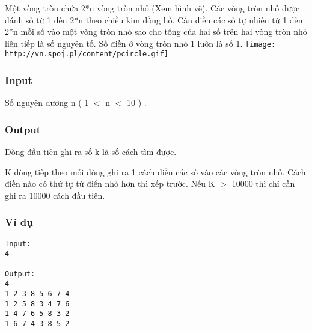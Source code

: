 



   Một vòng tròn chứa 2*n vòng tròn nhỏ (Xem hình vẽ). Các vòng tròn nhỏ được đánh số từ 1 đến 2*n theo chiều kim đồng hồ. Cần điền các số tự nhiên từ 1 đến 2*n mỗi số vào một vòng tròn nhỏ sao cho tổng của hai số trên hai vòng tròn nhỏ liên tiếp là số nguyên tố. Số điền ở vòng tròn nhỏ 1 luôn là số 1.  
\texttt{[image: http://vn.spoj.pl/content/pcircle.gif]}

\subsubsection{   Input  }

   Số nguyên dương n ( 1 $<$ n $<$ 10 ) .  

\subsubsection{   Output  }

   Dòng đầu tiên ghi ra số k là số cách tìm được.   


   K dòng tiếp theo mỗi dòng ghi ra 1 cách điền các số vào các vòng tròn nhỏ. Cách điền nào có thứ tự từ điển nhỏ hơn thì xếp trước. Nếu K $>$ 10000 thì chỉ cần ghi ra 10000 cách đầu tiên.  

\subsubsection{   Ví dụ  }
\begin{verbatim}
Input:
4

Output:
4
1 2 3 8 5 6 7 4
1 2 5 8 3 4 7 6
1 4 7 6 5 8 3 2
1 6 7 4 3 8 5 2

\end{verbatim}
